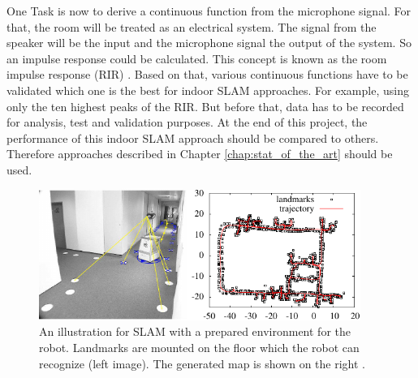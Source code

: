 One Task is now to derive a continuous function from the microphone signal. For that, the room will be treated as an electrical system. The signal from the speaker will be the input and the microphone signal the output of the system. So an impulse response could be calculated. This concept is known as the room impulse response (RIR) \cite{dokmanic_roomrecslam_2016}. Based on that, various continuous functions have to be validated which one is the best for indoor SLAM approaches. For example, using only the ten highest peaks of the RIR. But before that, data has to be recorded for analysis, test and validation purposes. At the end of this project, the performance of this indoor SLAM approach should be compared to others. Therefore approaches described in Chapter \ref{chap:stat_of_the_art} should be used.

\begin{figure}[h!]
	\centering
	\includegraphics[width=0.935\textwidth]{images/grisetti_slam_example.png}
	\caption{
		An illustration for SLAM with a prepared environment for the robot. Landmarks are mounted on the floor which the robot can recognize (left image). The generated map is shown on the right \cite{grisetti_tutorial_2010}.
	}
	\label{fig:grisetti_slam_example}
\end{figure}